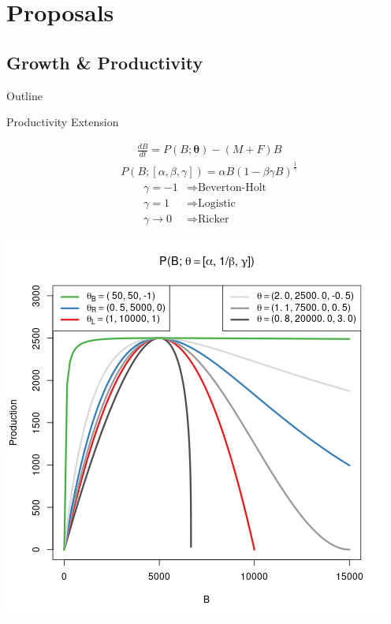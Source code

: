 \documentclass[ xcolor = pdftex, dvipsnames, table ]{beamer}
\begin{document}
%
\section{Proposals}
\subsection{Growth \& Productivity}
\begin{frame}{Outline}
\end{frame}

%
\begin{frame}{Productivity Extension}
\begin{minipage}[h!]{0.49\textwidth}
\begin{align}
&\frac{dB}{dt} = P(B;\bm{\theta}) - (M+F)B \nonumber%
\end{align}
\begin{align}
&P(B;[\alpha, \beta, \gamma]) = \alpha B(1-\beta\gamma B)^{\frac{1}{\gamma}} \nonumber
\end{align}
\begin{align*}
\gamma = -1 &\Rightarrow \text{Beverton-Holt}\\
\gamma = 1 &\Rightarrow  \text{Logistic}\\
\gamma \rightarrow 0 &\Rightarrow \text{Ricker}
\end{align*}
\end{minipage}
\begin{minipage}[h!]{0.49\textwidth}
\includegraphics[width=\textwidth]{../plots/derisoSrr.png}
\end{minipage}
\end{frame}
\end{document}
